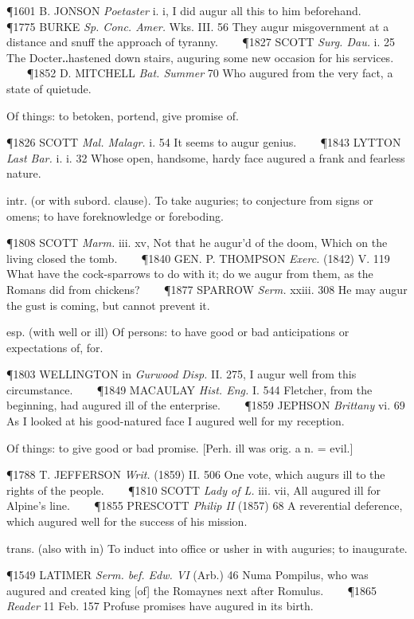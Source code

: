 \begin{description}[wide, labelwidth=!, labelindent=0pt]
\begin{myenumerate}
\P 1601 B. JONSON  \textit{Poetaster} i. i, I did augur all this to him beforehand.    
\P 1775 BURKE  \textit{Sp. Conc. Amer.} Wks. III. 56 They augur misgovernment at a distance and snuff the approach of tyranny.    
\P 1827 SCOTT  \textit{Surg. Dau.} i. 25 The Docter‥hastened down stairs, auguring some new occasion for his services.    
\P 1852 D. MITCHELL  \textit{Bat. Summer} 70 Who augured from the very fact, a state of quietude.

 Of things: to betoken, portend, give promise of.

\P 1826 SCOTT  \textit{Mal. Malagr.} i. 54 It seems to augur genius.    
\P 1843 LYTTON  \textit{Last Bar.} i. i. 32 Whose open, handsome, hardy face augured a frank and fearless nature.

 intr. (or with subord. clause). To take auguries; to conjecture from signs or omens; to have foreknowledge or foreboding.

\P 1808 SCOTT  \textit{Marm.} iii. xv, Not that he augur'd of the doom, Which on the living closed the tomb.    
\P 1840 GEN. P. THOMPSON  \textit{Exerc.} (1842) V. 119 What have the cock-sparrows to do with it; do we augur from them, as the Romans did from chickens?    
\P 1877 SPARROW  \textit{Serm.} xxiii. 308 He may augur the gust is coming, but cannot prevent it.

 esp. (with well or ill)  Of persons: to have good or bad anticipations or expectations of, for.

\P 1803 WELLINGTON in \textit{Gurwood Disp.} II. 275, I augur well from this circumstance.    
\P 1849 MACAULAY  \textit{Hist. Eng.} I. 544 Fletcher, from the beginning, had augured ill of the enterprise.    
\P 1859 JEPHSON  \textit{Brittany} vi. 69 As I looked at his good-natured face I augured well for my reception.

 Of things: to give good or bad promise. [Perh. ill was orig. a n. = evil.]

\P 1788 T. JEFFERSON  \textit{Writ.} (1859) II. 506 One vote, which augurs ill to the rights of the people.    
\P 1810 SCOTT  \textit{Lady of L.} iii. vii, All augured ill for Alpine's line.    
\P 1855 PRESCOTT  \textit{Philip II} (1857) 68 A reverential deference, which augured well for the success of his mission.

 trans. (also with in) To induct into office or usher in with auguries; to inaugurate.

\P 1549 LATIMER  \textit{Serm. bef. Edw. VI} (Arb.) 46 Numa Pompilus, who was augured and created king [of] the Romaynes next after Romulus.    
\P 1865 \textit{Reader}  11 Feb. 157 Profuse promises have augured in its birth.
\end{myenumerate}





\end{description}
